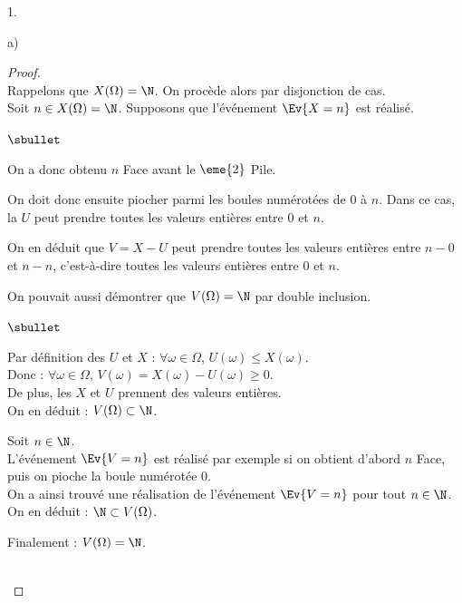 \begin{noliste}{1.}
\begin{noliste}{a)}
    \begin{proof}~\\
      Rappelons que $X(\Omega)=\N$. On procède alors par disjonction de 
      cas.\\
      Soit $n\in X(\Omega)= \N$. Supposons que l'événement $\Ev{X=n}$ 
      est réalisé.
      \begin{noliste}{$\sbullet$}
        \item On a donc obtenu $n$ Face avant le $\eme{2}$ Pile.
        \item On doit donc ensuite piocher parmi les boules 
        numérotées de $0$ à $n$. Dans ce cas, la \var $U$ peut 
	prendre toutes les valeurs entières entre $0$ et $n$.
	\item On en déduit que $V=X-U$ peut prendre toutes les 
	valeurs entières entre $n-0$ et $n-n$, c'est-à-dire toutes 
	les valeurs entières entre $0$ et $n$.
      \end{noliste}
      
      \begin{remark}
        On pouvait aussi démontrer que $V(\Omega) = \N$ par double 
        inclusion.
        \begin{noliste}{$\sbullet$}
          \item Par définition des \var $U$ et $X$ : $\forall \omega 
          \in \Omega$, $U(\omega) \leq X(\omega)$.\\
          Donc : $\forall \omega \in \Omega$, $V(\omega) = 
          X(\omega) - U(\omega) \geq 0$.\\
          De plus, les \var $X$ et $U$ prennent des valeurs entières.\\
          On en déduit : $V(\Omega) \subset \N$.
          
          \item Soit $n \in \N$.\\
          L'événement $\Ev{V=n}$ est réalisé par exemple si on 
          obtient d'abord $n$ Face, puis on pioche la boule numérotée 
	  $0$.\\
	  On a ainsi trouvé une réalisation de l'événement $\Ev{V=n}$
	  pour tout $n\in \N$.\\
	  On en déduit : $\N \subset V(\Omega)$.
        \end{noliste}
        Finalement : $V(\Omega) = \N$.
      \end{remark}~\\[-1.4cm]
    \end{proof}
    

\end{noliste}
\end{noliste}
